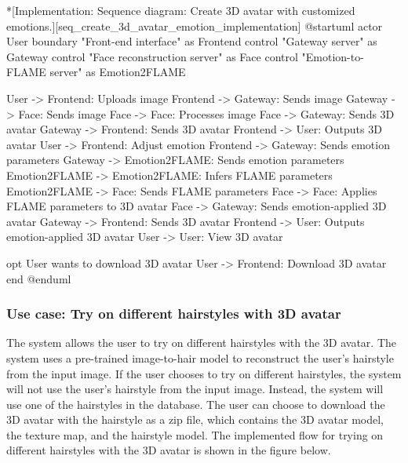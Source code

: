 \begin{umlfigure}*[Implementation: Sequence diagram: Create 3D avatar with customized emotions.][seq_create_3d_avatar_emotion_implementation]
    @startuml
    actor User
    boundary "Front-end interface" as Frontend
    control "Gateway server" as Gateway
    control "Face reconstruction server" as Face
    control "Emotion-to-FLAME server" as Emotion2FLAME

    User -> Frontend: Uploads image
    Frontend -> Gateway: Sends image
    Gateway -> Face: Sends image
    Face -> Face: Processes image
    Face -> Gateway: Sends 3D avatar
    Gateway -> Frontend: Sends 3D avatar
    Frontend -> User: Outputs 3D avatar
    User -> Frontend: Adjust emotion
    Frontend -> Gateway: Sends emotion parameters
    Gateway -> Emotion2FLAME: Sends emotion parameters
    Emotion2FLAME -> Emotion2FLAME: Infers FLAME parameters
    Emotion2FLAME -> Face: Sends FLAME parameters
    Face -> Face: Applies FLAME parameters to 3D avatar
    Face -> Gateway: Sends emotion-applied 3D avatar
    Gateway -> Frontend: Sends 3D avatar
    Frontend -> User: Outputs emotion-applied 3D avatar
    User -> User: View 3D avatar

    opt User wants to download 3D avatar
    User -> Frontend: Download 3D avatar
    end
    @enduml
\end{umlfigure}

\clearpage

\subsubsection{Use case: Try on different hairstyles with 3D avatar}


The system allows the user to try on different hairstyles with the 3D avatar. The system uses a pre-trained image-to-hair model to reconstruct the user's hairstyle from the input image. If the user chooses to try on different hairstyles, the system will not use the user's hairstyle from the input image. Instead, the system will use one of the hairstyles in the database. The user can choose to download the 3D avatar with the hairstyle as a zip file, which contains the 3D avatar model, the texture map, and the hairstyle model. The implemented flow for trying on different hairstyles with the 3D avatar is shown in the figure below.

\clearpage

